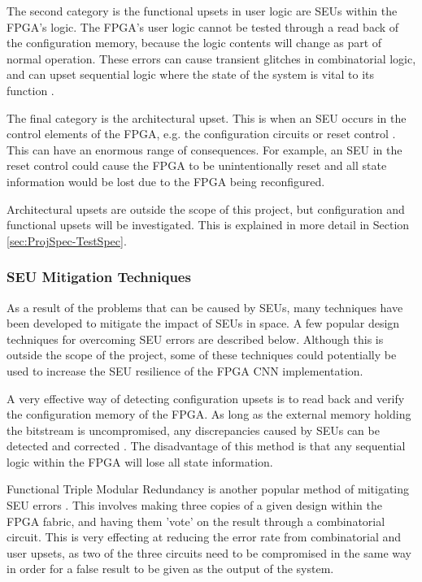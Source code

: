 \documentclass[12pt]{article}
\begin{document}
The second category is the functional upsets in user logic are SEUs within the FPGA's logic. The FPGA's user logic cannot be tested through a read back of the configuration memory, because the logic contents will change as part of normal operation. These errors can cause transient glitches in combinatorial logic, and can upset sequential logic where the state of the system is vital to its function \cite{FTripleMR}.

The final category is the architectural upset. This is when an SEU occurs in the control elements of the FPGA, e.g. the configuration circuits or reset control \cite{SuitabilityGaisler}. This can have an enormous range of consequences. For example, an SEU in the reset control could cause the FPGA to be unintentionally reset and all state information would be lost due to the FPGA being reconfigured.

Architectural upsets are outside the scope of this project, but configuration and functional upsets will be investigated. This is explained in more detail in Section \ref{sec:ProjSpec-TestSpec}.

\subsubsection{SEU Mitigation Techniques}
\label{sec:Background-FPGAsAndSpaceApplications-Mitigation}

As a result of the problems that can be caused by SEUs, many techniques have been developed to mitigate the impact of SEUs in space. A few popular design techniques for overcoming SEU errors are described below. Although this is outside the scope of the project, some of these techniques could potentially be used to increase the SEU resilience of the FPGA CNN implementation.

A very effective way of detecting configuration upsets is to read back and verify the configuration memory of the FPGA. As long as the external memory holding the bitstream is uncompromised, any discrepancies caused by SEUs can be detected and corrected \cite{SuitabilityGaisler}. The disadvantage of this method is that any sequential logic within the FPGA will lose all state information.

Functional Triple Modular Redundancy is another popular method of mitigating SEU errors \cite{FTripleMR}. This involves making three copies of a given design within the FPGA fabric, and having them 'vote' on the result through a combinatorial circuit. This is very effecting at reducing the error rate from combinatorial and user upsets, as two of the three circuits need to be compromised in the same way in order for a false result to be given as the output of the system.
\end{document}
